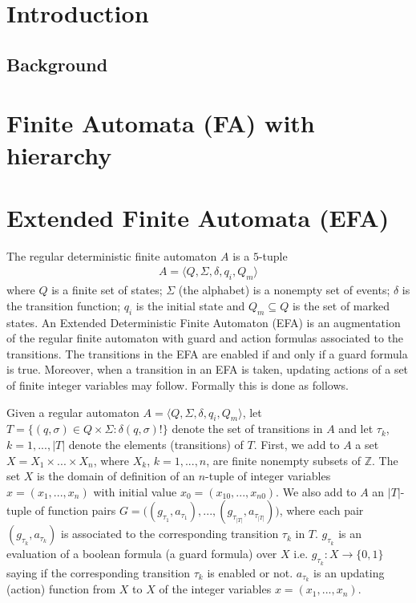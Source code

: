 \documentclass{article}
\begin{document}
\tableofcontents
\section{Introduction}

\subsection{Background}
\newpage
\section{Finite Automata (FA) with hierarchy}

\section{Extended Finite Automata (EFA)}
The regular deterministic finite automaton $A$ is a $5$-tuple
\begin{eqnarray}
A=\langle Q,\Sigma,\delta, q_i,Q_m \rangle\nonumber
\end{eqnarray} where $Q$ is a finite set of states; $\Sigma$ (the alphabet) is a nonempty
set of events; $\delta$ is the transition function; $q_i$ is the
initial state and $Q_m \subseteq Q$ is the set of marked states.
An Extended Deterministic Finite Automaton (EFA) is an
augmentation of the regular finite automaton with guard and action
formulas associated to the transitions. The transitions in the EFA
are enabled if and only if a guard formula is true. Moreover, when
a transition in an EFA is taken, updating actions of a set of
finite integer variables may follow. Formally this is done as
follows.

Given a regular automaton $A=\langle Q,\Sigma,\delta, q_i,Q_m
\rangle$, let $T=\{(q,\sigma)\in Q \times \Sigma:
\delta(q,\sigma)!\}$ denote the set of transitions in $A$ and let
$\tau_k$, $k=1,...,|T|$ denote the elements (transitions) of $T$.
First, we add to $A$ a set $X=X_1\times ... \times X_n$, where
$X_k$, $k=1,...,n$, are finite nonempty subsets of $\mathbb{Z}$.
The set $X$ is the domain of definition of an $n$-tuple of integer
variables $x=(x_1,...,x_n)$ with initial value
$x_0=(x_{10},...,x_{n0})$. We also add to $A$ an $|T|$-tuple of
function pairs $G=\big((g_{\tau_1},a_{\tau_1}),...,
(g_{\tau_{|T|}},a_{\tau_{|T|}})\big)$, where each pair
$(g_{\tau_k},a_{\tau_k})$ is associated to the corresponding
transition $\tau_k$ in $T$. $g_{\tau_k}$ is an evaluation of a
boolean formula (a guard formula) over $X$ i.e. $g_{\tau_k}:X
\rightarrow \{0,1\}$ saying if the corresponding transition
$\tau_k$ is enabled or not. $a_{\tau_k}$ is an updating (action)
function from $X$ to $X$ of the integer variables
$x=(x_1,...,x_n)$.
\end{document}
